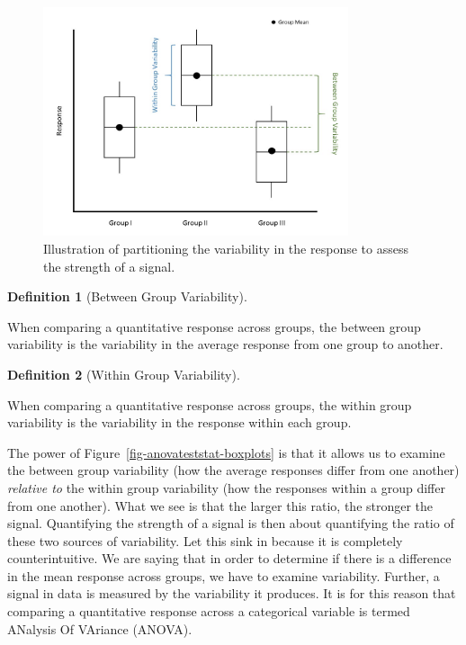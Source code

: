 \documentclass[
  letterpaper,
  DIV=11,
  numbers=noendperiod]{scrreprt}
\theoremstyle{plain}
\theoremstyle{definition}
\theoremstyle{definition}
\newtheorem{definition}{Definition}[chapter]
\theoremstyle{remark}
\begin{document}
\begin{figure}

{\centering \includegraphics[width=0.8\textwidth,height=\textheight]{./images/ANOVATestStat-Partition-Variability.jpg}

}

\caption{\label{fig-anovateststat-partition-variability}Illustration of
partitioning the variability in the response to assess the strength of a
signal.}

\end{figure}

\begin{definition}[Between Group
Variability]\protect\hypertarget{def-between-group-variability}{}\label{def-between-group-variability}

When comparing a quantitative response across groups, the between group
variability is the variability in the average response from one group to
another.

\end{definition}

\begin{definition}[Within Group
Variability]\protect\hypertarget{def-within-group-variability}{}\label{def-within-group-variability}

When comparing a quantitative response across groups, the within group
variability is the variability in the response within each group.

\end{definition}

The power of Figure~\ref{fig-anovateststat-boxplots} is that it allows
us to examine the between group variability (how the average responses
differ from one another) \emph{relative to} the within group variability
(how the responses within a group differ from one another). What we see
is that the larger this ratio, the stronger the signal. Quantifying the
strength of a signal is then about quantifying the ratio of these two
sources of variability. Let this sink in because it is completely
counterintuitive. We are saying that in order to determine if there is a
difference in the mean response across groups, we have to examine
variability. Further, a signal in data is measured by the variability it
produces. It is for this reason that comparing a quantitative response
across a categorical variable is termed ANalysis Of VAriance (ANOVA).
\end{document}
